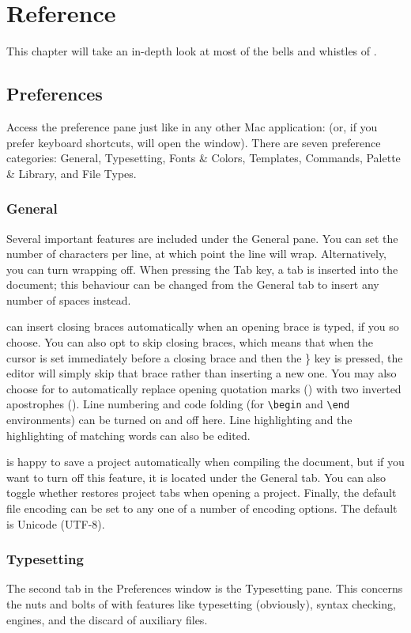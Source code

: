 \chapter{Reference}
\label{reference}
This chapter will take an in-depth look at most of the bells and whistles of \texnicle.

\section{Preferences}
\label{reference.prefs}
Access the preference pane just like in any other Mac application:  (or, if you prefer keyboard shortcuts, \keys{\cmdkey +,} will open the window). There are seven preference categories: General, Typesetting, Fonts \& Colors, Templates, Commands, Palette \& Library, and File Types.

\subsection{General}
\label{reference.prefs.gen}
Several important features are included under the General pane. You can set the number of characters per line, at which point the line will wrap. Alternatively, you can turn wrapping off. When pressing the Tab key, a tab is inserted into the document; this behaviour can be changed from the General tab to insert any number of spaces instead.

\texnicle can insert closing braces automatically when an opening brace is typed, if you so choose. You can also opt to skip closing braces, which means that when the cursor is set immediately before a closing brace and then the \} key is pressed, the editor will simply skip that brace rather than inserting a new one. You may also choose for \texnicle to automatically replace opening quotation marks () with two inverted apostrophes (). Line numbering and code folding (for \verb|\begin| and \verb|\end| environments) can be turned on and off here. Line highlighting and the highlighting of matching words can also be edited.

\texnicle is happy to save a project automatically when compiling the document, but if you want to turn off this feature, it is located under the General tab. You can also toggle whether \texnicle restores project tabs when opening a project. Finally, the default file encoding can be set to any one of a number of encoding options. The default is Unicode (UTF-8).

\subsection{Typesetting}
\label{reference.prefs.type}
The second tab in the Preferences window is the Typesetting pane. This concerns the nuts and bolts of \texnicle with features like typesetting (obviously), syntax checking, engines, and the discard of auxiliary files.

